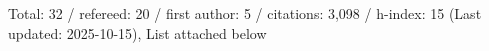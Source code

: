 Total: 32 / refereed: 20 / first author: 5 / citations: 3,098 / h-index: 15 (Last updated: 2025-10-15), List attached below